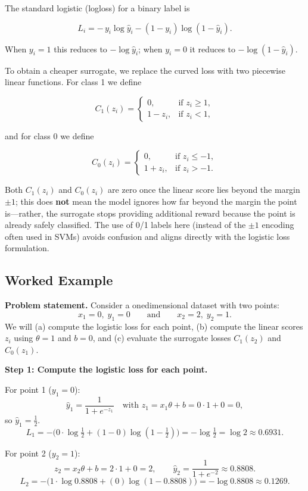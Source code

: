 \documentclass[12pt, a4paper]{article}
\begin{document}
The standard logistic (logloss) for a binary label is  

\[
L_i = -\,y_i\log\hat{y}_i - (1-y_i)\log(1-\hat{y}_i).
\]  

When \(y_i=1\) this reduces to \(-\log\hat{y}_i\); when \(y_i=0\) it reduces to \(-\log(1-\hat{y}_i)\).  

To obtain a cheaper surrogate, we replace the curved loss with two piecewise linear functions.  
For class 1 we define  

\[
C_1(z_i)=
\begin{cases}
0, & \text{if } z_i \ge 1,\\[4pt]
1 - z_i, & \text{if } z_i < 1,
\end{cases}
\] 

and for class 0 we define  

\[
C_0(z_i)=
\begin{cases}
0, & \text{if } z_i \le -1,\\[4pt]
1 + z_i, & \text{if } z_i > -1.
\end{cases}
\]  

Both \(C_1(z_i)\) and \(C_0(z_i)\) are zero once the linear score lies beyond the margin \(\pm1\); this does \textbf{not} mean the model ignores how far beyond the margin the point is---rather, the surrogate stops providing additional reward because the point is already safely classified.  
The use of 0/1 labels here (instead of the \(\pm1\) encoding often used in SVMs) avoids confusion and aligns directly with the logistic loss formulation.

\subsection{Worked Example}
\textbf{Problem statement.}  
Consider a onedimensional dataset with two points:
\[
x_1 = 0,\; y_1 = 0 \qquad\text{and}\qquad x_2 = 2,\; y_2 = 1.
\]  
We will (a) compute the logistic loss for each point, (b) compute the linear scores \(z_i\) using \(\theta = 1\) and \(b = 0\), and (c) evaluate the surrogate losses \(C_1(z_2)\) and \(C_0(z_1)\).

\textbf{Step 1: Compute the logistic loss for each point.}  

For point 1 (\(y_1=0\)):
\[
\hat{y}_1 = \frac{1}{1+e^{-z_1}} \quad\text{with } z_1 = x_1\theta + b = 0\cdot 1 + 0 = 0,
\]
so \(\hat{y}_1 = \tfrac12\).
\[
L_1 = -\bigl(0\cdot\log\tfrac12 + (1-0)\log(1-\tfrac12)\bigr) = -\log\tfrac12 = \log 2 \approx 0.6931.
\]

For point 2 (\(y_2=1\)):
\[
z_2 = x_2\theta + b = 2\cdot 1 + 0 = 2,\qquad
\hat{y}_2 = \frac{1}{1+e^{-2}} \approx 0.8808.
\]
\[
L_2 = -\bigl(1\cdot\log 0.8808 + (0)\log(1-0.8808)\bigr) = -\log 0.8808 \approx 0.1269.
\]
\end{document}

